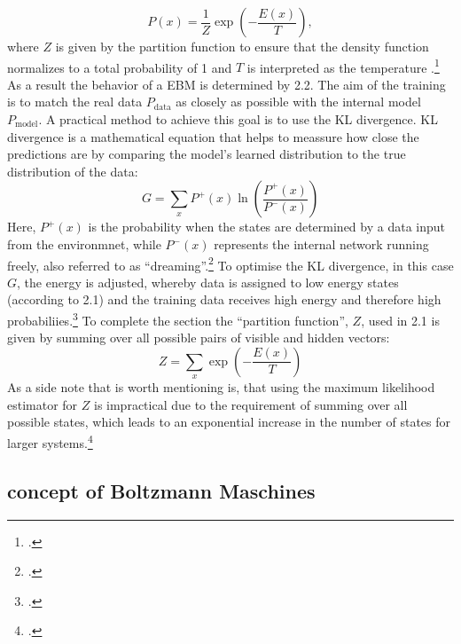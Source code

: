 \begin{equation}
    P(x) = \frac{1}{Z} \exp\left(-\frac{E(x)}{T}\right),
\end{equation}
where \( Z \) is given by the partition function to ensure
that the density function normalizes to a total probability of 1 and \( T \) is interpreted as the temperature .\footcite[Vgl.][2-3]{huembeliPhysicsEnergybasedModels2022}
As a result the behavior of a \ac{EBM} is determined by 2.2. 
The aim of the training is to match the real data \( P_{\text{data}} \) as closely as possible with the internal model \( P_{\text{model}} \).
A practical method to achieve this goal is to use the KL divergence. KL divergence is a mathematical equation that helps to meassure how close the predictions are by comparing the model's learned distribution to the true distribution of the data:
\begin{equation}
    G = \sum_x P^+(x) \ln \left( \frac{P^+(x)}{P^-(x)} \right)
\end{equation}
Here, \(P^+(x)\) is the probability when the states are determined by a data input from the environmnet, while \(P^-(x)\) represents the internal network running freely, also referred to as ``dreaming''.\footcite[Vgl.][154-155]{ackleyLearningAlgorithmBoltzmann1985}
To optimise the KL divergence, in this case \( G \), the energy is adjusted, whereby data is assigned to low energy states (according to 2.1) and the training data receives high energy and therefore high probabiliies.\footcite[Vgl.][2-3]{zhaiDeepStructuredEnergy2016}
To complete the section the ``partition function'', \( Z \), used in 2.1 is given by summing over all possible pairs of visible and hidden vectors:
\begin{equation}
    Z = \sum_x \exp\left(-\frac{E(x)}{T}\right)
\end{equation}
As a side note that is worth mentioning is, that using the maximum likelihood estimator for \( Z \) is impractical due to the requirement of summing over all possible states, which leads to an exponential increase in the number of states for larger systems.\footcite[Vgl.][2-3]{zhaiDeepStructuredEnergy2016}

\subsection{concept of Boltzmann Maschines}

